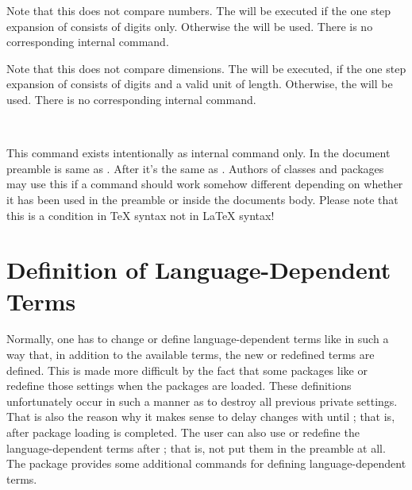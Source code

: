\begin{Declaration}
\end{Declaration}
%
Note that this does not compare numbers.  The  will
be executed if the one step expansion of  consists of digits
only. Otherwise the  will be used. There is no
corresponding internal command.
%
%


\begin{Declaration}
\end{Declaration}
%
Note that this does not compare dimensions. The  will
be executed, if the one step expansion of  consists of digits
and a valid unit of length. Otherwise, the  will be
used. There is no corresponding internal command.
%
%


\begin{Declaration}
  \  
  \  
\end{Declaration}
%
This command exists intentionally as internal command only. In the document
preamble  is same as . After
 it's the same as . Authors of
classes and packages may use this if a command should work somehow different
depending on whether it has been used in the preamble or inside the documents
body. Please note that this is a condition in \TeX{}
syntax not in \LaTeX{} syntax!
%
%


\section{Definition of Language-Dependent Terms}
\label{sec:scrbase.languageSupport}

Normally, one has to change or define language-dependent terms like
 in such a way that, in addition to the available terms,
the new or redefined terms are defined. This is made more difficult by the
fact that some packages like  or
 redefine those settings when the
packages are loaded. These definitions unfortunately occur in such a manner as
to destroy all previous private settings. That is also the reason why it makes
sense to delay changes with  until
; that is, after package loading is
completed. The user can also use  or redefine the
language-dependent terms after ; that is,
not put them in the preamble at all. The package 
provides some additional commands for defining language-dependent terms.


